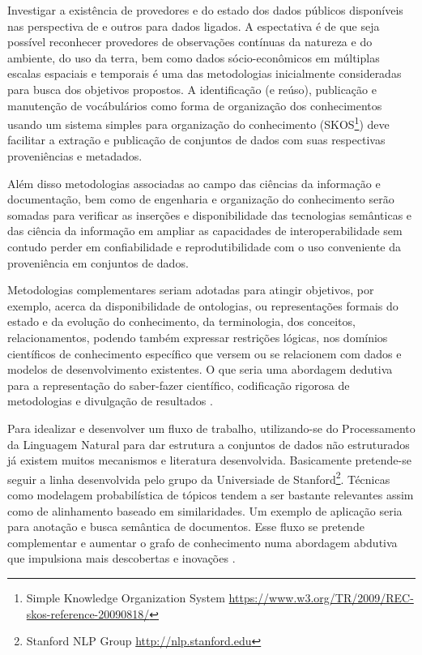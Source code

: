 \documentclass[
	12pt,				%
	openany,			%
	oneside,			%
	a4paper,			%
	english,			%
	french,				%
	spanish,			%
	brazil,				%
	]{abntex2}
\begin{document}
Investigar a existência de provedores e do estado dos dados públicos disponíveis nas perspectiva de  e outros \cite{bizer_linked_2009} para dados ligados. A espectativa é de que seja possível reconhecer provedores de observações contínuas da natureza e do ambiente, do uso da terra, bem como dados sócio-econômicos em múltiplas escalas espaciais e temporais é uma das metodologias inicialmente consideradas para busca dos objetivos propostos. A identificação (e reúso), publicação e manutenção de vocábulários como forma de organização dos conhecimentos usando um sistema simples para organização do conhecimento (SKOS\footnote{Simple Knowledge Organization System \url{https://www.w3.org/TR/2009/REC-skos-reference-20090818/}}) deve facilitar a extração e publicação de conjuntos de dados com suas respectivas proveniências e metadados.

Além disso metodologias associadas ao campo das ciências da informação e documentação, bem como de engenharia e organização do conhecimento serão somadas para verificar as inserções e disponibilidade das tecnologias semânticas \cite{tim_berners-lee_james_hendler_and_ora_lassila_semantic_2001,berners-lee_publishing_2001,narock_science_2012,ma_semantic_2015,mattoso_addressing_2016} e das ciência da informação \cite{baker_egy:_2009, fox_rise_2012} em ampliar as capacidades de interoperabilidade \cite{cardoso_semantic_2003} sem contudo perder em confiabilidade \cite{gil_towards_2007} e reprodutibilidade \cite{mattoso_addressing_2016} com o uso conveniente da proveniência \cite{lebo_prov-o:_2013} em conjuntos de dados.

Metodologias complementares seriam adotadas para atingir objetivos, por exemplo, acerca da disponibilidade de ontologias, ou representações formais do estado e da evolução do conhecimento, da terminologia, dos conceitos, relacionamentos, podendo também expressar restrições lógicas, nos domínios científicos de conhecimento específico que versem ou se relacionem com dados e modelos de desenvolvimento existentes. O que seria uma abordagem dedutiva para a representação do saber-fazer científico, codificação rigorosa de metodologias e divulgação de resultados \cite{patton_semnext:_2015,mattoso_addressing_2016,diviacco_collaborative_2015}.

Para idealizar e desenvolver um fluxo de trabalho, utilizando-se do Processamento da Linguagem Natural para dar estrutura a conjuntos de dados não estruturados já existem muitos mecanismos e literatura desenvolvida. Basicamente pretende-se seguir a linha desenvolvida pelo grupo da Universiade de Stanford\footnote{Stanford NLP Group \url{http://nlp.stanford.edu}}. Técnicas como modelagem probabilística de tópicos \cite{blei_probabilistic_2012} tendem a ser bastante relevantes assim como de alinhamento baseado em similaridades. Um exemplo de aplicação seria para anotação e busca semântica de documentos. Esse fluxo se pretende complementar e aumentar o grafo de conhecimento numa abordagem abdutiva que impulsiona mais descobertas e inovações \cite{gil_data_2009}.
\end{document}
